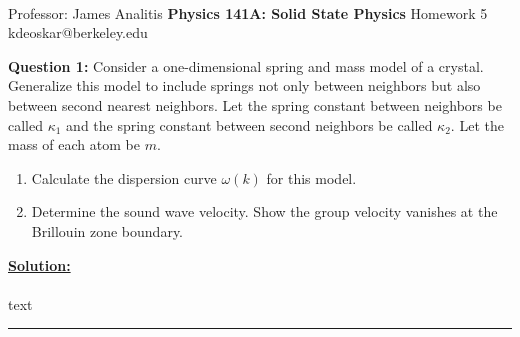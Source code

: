 \documentclass[11pt]{article}
\begin{document}
\thispagestyle{empty}
\bigskip \
\vspace{0.1cm}

\begin{center}
{\fontsize{22}{22} \selectfont Professor: James Analitis}
\vskip 16pt
{\fontsize{30}{30} \selectfont \bf \sffamily Physics 141A: Solid State Physics}
\vskip 24pt
{\fontsize{14}{14} \selectfont \rmfamily Homework 5} 
\vskip 6pt
{\fontsize{14}{14} \selectfont \ttfamily kdeoskar@berkeley.edu} 
\vskip 24pt
\end{center}




\begin{bluebox}
  \textbf{Question 1:} Consider a one-dimensional spring and mass model of a crystal. Generalize this model to include springs not only between neighbors but also between second nearest neighbors. Let the spring constant between neighbors be called $\kappa_1$ and the spring constant between second neighbors be called $\kappa_2$. Let the mass of each atom be $m$. 
  \begin{enumerate}[label=(\alph*)]
    \item Calculate the dispersion curve $\omega(k)$ for this model.
    \item Determine the sound wave velocity. Show the group velocity vanishes at the Brillouin zone boundary.
  \end{enumerate}
\end{bluebox}

\vskip 0.5cm
\textbf{\underline{Solution:}}
\\
\\
text
\vskip 0.5cm
\hrule
\pagebreak
\end{document}
